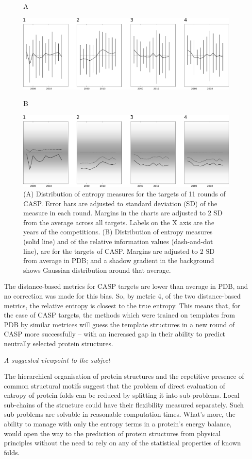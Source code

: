 \documentclass[12pt,aps]{revtex4}
\begin{document}
\begin{figure}[h]
\flushleft \large \textsf{A}\\
\vskip 4pt
\centerline{\includegraphics[width=0.85\columnwidth]{casp_f1.png}}
\flushleft \large \textsf{B}\\
\vskip 4pt
\centerline{\includegraphics[width=0.85\columnwidth]{casp_f2.png}}
\caption{(A) Distribution of entropy measures for the targets of 11 rounds of CASP. Error bars are adjusted to standard deviation (SD) of the measure in each round. Margins in the charts are adjusted to 2 SD from the average across all targets. Labels on the X axis are the years of the competitions. (B) Distribution of entropy measures (solid line) and of the relative information values (dash-and-dot line), are for the targets of CASP. Margins are adjusted to 2 SD from average in PDB; and a shadow gradient in the background shows Gaussian distribution around that average. }
\label{casp_f12}
\end{figure}

The distance-based metrics for CASP targets are lower than average in PDB, and no correction was made for this bias. So, by metric 4, of the two distance-based metrics, the relative entropy is closest to the true entropy. This means that, for the case of CASP targets, the methods which were trained on templates from PDB by similar metrices will guess the template structures in a new round of CASP more successfully – with an increased gap in their ability to predict neutrally selected protein structures.

\emph{A suggested viewpoint to the subject}

The hierarchical organisation of protein structures and the repetitive presence of common structural motifs suggest that the problem of direct evaluation of entropy of protein folds can be reduced by splitting it into sub-problems. Local sub-chains of the structure could have their flexibility measured separately. Such sub-problems are solvable in reasonable computation times. What’s more, the ability to manage with only the entropy terms in a protein's energy balance, would open the way to the prediction of protein structures from physical principles without the need to rely on any of the statistical properties of known folds.  
\end{document}
